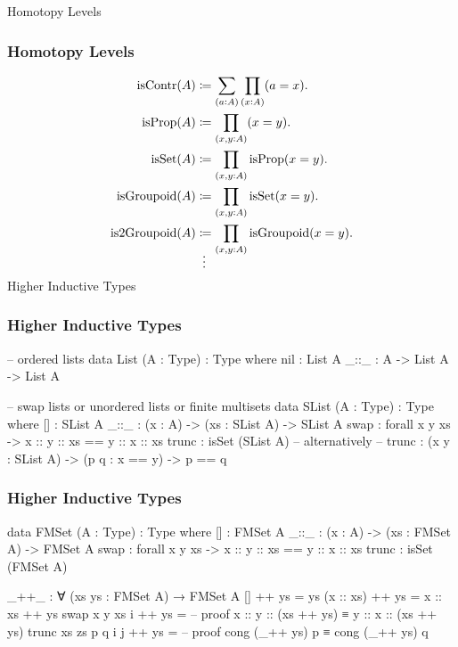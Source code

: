 \documentclass[9pt]{beamer}
\begin{document}
\begin{frame}{Homotopy Levels}
\frametitle{Homotopy Levels}

\begin{align*}
  \text{isContr}(A) & \coloneqq \sum_{(a:A)} \prod_{(x:A)} (a = x).
  \\
  \text{isProp}(A) & \coloneqq \prod_{(x,y:A)} (x = y).
  \\
  \text{isSet}(A) & \coloneqq \prod_{(x,y:A)} \text{isProp}(x = y).
  \\
  \text{isGroupoid}(A) & \coloneqq \prod_{(x,y:A)} \text{isSet}(x = y).
  \\
  \text{is2Groupoid}(A) & \coloneqq \prod_{(x,y:A)} \text{isGroupoid}(x = y).
  \\
  \shortvdotswithin{=}
\end{align*}

\end{frame}


\begin{frame}[fragile]{Higher Inductive Types}
\frametitle{Higher Inductive Types}

\begin{code}
-- ordered lists
data List (A : Type) : Type where
  nil : List A
  _::_ : A -> List A -> List A

-- swap lists or unordered lists or finite multisets
data SList (A : Type) : Type where
  []    : SList A
  _::_  : (x : A) -> (xs : SList A) -> SList A
  swap  : forall x y xs -> x :: y :: xs == y :: x :: xs
  trunc : isSet (SList A)
  -- alternatively
  -- trunc : (x y : SList A) -> (p q : x == y) -> p == q
\end{code}

\end{frame}

\begin{frame}[fragile]
\frametitle{Higher Inductive Types}

\begin{code}
data FMSet (A : Type) : Type where
  []    : FMSet A
  _::_  : (x : A) -> (xs : FMSet A) -> FMSet A
  swap  : forall x y xs -> x :: y :: xs == y :: x :: xs
  trunc : isSet (FMSet A)

_++_ : ∀ (xs ys : FMSet A) → FMSet A
[] ++ ys = ys
(x :: xs) ++ ys = x :: xs ++ ys
swap x y xs i ++ ys =
  -- proof x :: y :: (xs ++ ys) ≡ y :: x :: (xs ++ ys)
trunc xs zs p q i j ++ ys =
  -- proof cong (_++ ys) p ≡ cong (_++ ys) q
\end{code}

\end{frame}
\end{document}
